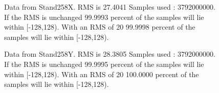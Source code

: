 \begin{figure}[ht] 				 				 				\caption{Data from Stand258X. RMS is 27.4041 Samples used : 3792000000. If the RMS is unchanged 99.9993 percent of the samples will lie within [-128,128).  				 With an RMS of 20 99.9998 percent of the samples will lie within [-128,128).} 				\end{figure} 

\begin{figure}[ht] 				 				 				\caption{Data from Stand258Y. RMS is 28.3805 Samples used : 3792000000. If the RMS is unchanged 99.9995 percent of the samples will lie within [-128,128).  				 With an RMS of 20 100.0000 percent of the samples will lie within [-128,128).} 				\end{figure} 


